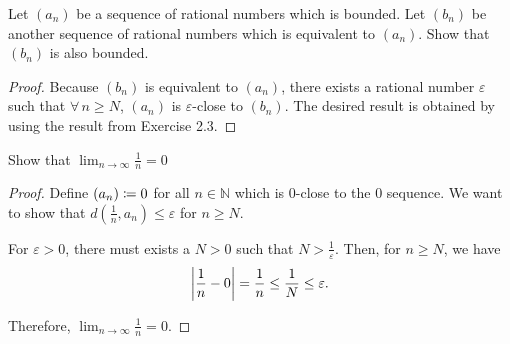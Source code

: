 \begin{exercise}
  Let $(a_n)$ be a sequence of rational numbers which is bounded. Let $(b_n)$ be another sequence of rational numbers which is equivalent to $(a_n)$.
  Show that $(b_n)$ is also bounded.
\end{exercise}
\begin{proof}
  Because $(b_n)$ is equivalent to $(a_n)$, there exists a rational number $\varepsilon$ such that $\forall\, n \geq N$, $(a_n)$ is $\varepsilon$-close to $(b_n)$.
  The desired result is obtained by using the result from Exercise 2.3.
\end{proof}

\begin{exercise}
  Show that $\lim_{n \to \infty} \frac{1}{n} = 0$
\end{exercise}
\begin{proof}
  Define $(a_n) \coloneqq 0$ for all $n \in \mathbb{N}$ which is $0$-close to the 0 sequence. We want to show that $d(\frac{1}{n}, a_n) \leq \varepsilon$ for $n \geq N$.
  \par For $\varepsilon > 0$, there must exists a $N > 0$ such that $N > \frac{1}{\varepsilon}$. Then, for $n \geq N$, we have \[
    \abs{\frac{1}{n} - 0} = \frac{1}{n} \leq \frac{1}{N} \leq \varepsilon.
  \] \par Therefore, $\lim_{n \to \infty} \frac{1}{n} = 0$.
\end{proof}

